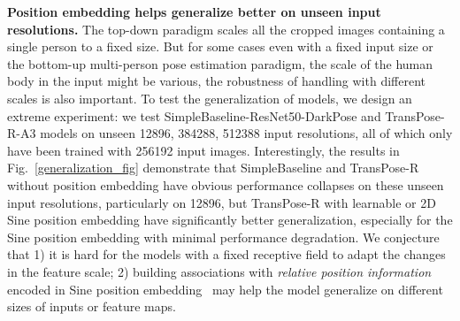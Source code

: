 \documentclass{article}
\begin{document}
{\bf Position embedding helps generalize better on unseen input resolutions.} The top-down paradigm scales all the cropped images containing a single person to a fixed size. But for some cases even with a fixed input size or the bottom-up multi-person pose estimation paradigm, the scale of the human body in the input might be various, the robustness of handling with different scales is also important. To test the generalization of models, we design an extreme experiment: we test SimpleBaseline-ResNet50-DarkPose and TransPose-R-A3 models on unseen 12896, 384288, 512388 input resolutions, all of which only have been trained with 256192 input images. Interestingly, the results in Fig.~\ref{generalization_fig} demonstrate that SimpleBaseline and TransPose-R without position embedding have obvious performance collapses on these unseen input resolutions, particularly on 12896, but TransPose-R with learnable or 2D Sine position embedding have significantly better generalization, especially for the Sine position embedding with minimal performance degradation. We conjecture that 1) it is hard for the models with a fixed receptive field to adapt the changes in the feature scale; 2) building associations with \emph{relative position information} encoded in Sine position embedding~\cite{vaswani2017attention} may help the model generalize on different sizes of inputs or feature maps.
\end{document}
